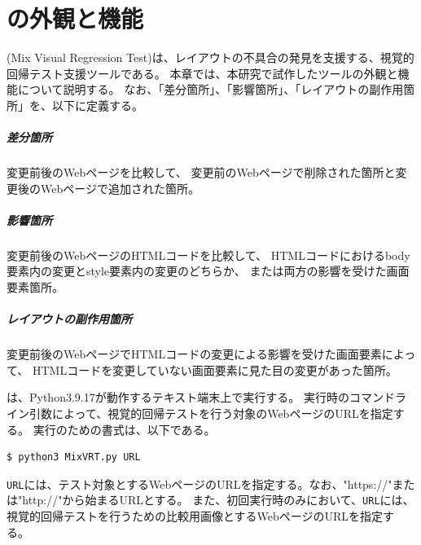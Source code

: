\chapter{ \toolName の外観と機能}\label{cha:Function}
\toolName (Mix Visual Regression Test)は、レイアウトの不具合の発見を支援する、視覚的回帰テスト支援ツールである。
本章では、本研究で試作したツール\toolName の外観と機能について説明する。
なお、「差分箇所」、「影響箇所」、「レイアウトの副作用箇所」を、以下に定義する。
\paragraph{差分箇所}
変更前後のWebページを比較して、
変更前のWebページで削除された箇所と変更後のWebページで追加された箇所。
\paragraph{影響箇所}
変更前後のWebページのHTMLコードを比較して、
HTMLコードにおけるbody要素内の変更とstyle要素内の変更のどちらか、
または両方の影響を受けた画面要素箇所。
\paragraph{レイアウトの副作用箇所}
変更前後のWebページでHTMLコードの変更による影響を受けた画面要素によって、
HTMLコードを変更していない画面要素に見た目の変更があった箇所。
\vspace{8mm}
\par

\toolName は、Python3.9.17\cite{Python}が動作するテキスト端末上で実行する。
\toolName 実行時のコマンドライン引数によって、視覚的回帰テストを行う対象のWebページのURLを指定する。
\toolName 実行のための書式は、以下である。
\begin{lstlisting}[label=list:command,frame=none,numbers=none,basicstyle={\normalsize \ttfamily \color[gray]{.15}}]
  $ python3 MixVRT.py URL
 \end{lstlisting}
{\tt URL}には、テスト対象とするWebページのURLを指定する。なお、"https://"または"http://"から始まるURLとする。
また、初回実行時のみにおいて、{\tt URL}には、視覚的回帰テストを行うための比較用画像とするWebページのURLを指定する。
\par

